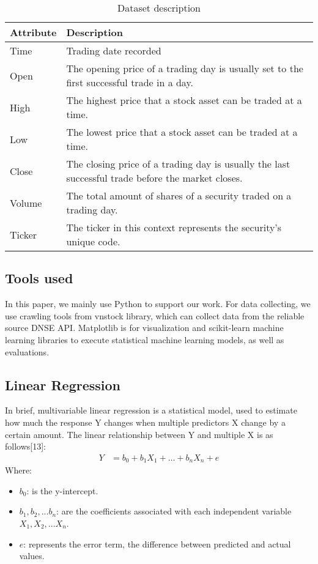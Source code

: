 \documentclass{ieeeojies}
\begin{document}
\begin{table}[h]
\caption{Dataset description}
\label{table}
\setlength{\tabcolsep}{3pt}
\begin{tabular}{|p{50pt}|p{155pt}|}
\hline
\textbf{Attribute}& 
\textbf{Description} \\
\hline
Time& 
Trading date recorded\\
\hline
Open& 
The opening price of a trading day is usually set to the first successful trade in a day.\\
\hline
High& 
The highest price that a stock asset can be traded at a time.\\
\hline
Low& 
The lowest price that a stock asset can be traded at a time.\\
\hline
Close&
The closing price of a trading day is usually the last successful trade before the market closes.\\
\hline
Volume&
The total amount of shares of a security traded on a trading day.\\
\hline
Ticker&
The ticker in this context represents the security’s unique code.\\
\hline
\end{tabular}
\label{tab1}
\end{table}
\subsection{Tools used}
In this paper, we mainly use Python to support our work. For data collecting, we use crawling tools from vnstock library, which can collect data from the reliable source DNSE API. Matplotlib is for visualization and scikit-learn machine learning libraries to execute statistical machine learning models, as well as evaluations.
\subsection{Linear Regression}
In brief, multivariable linear regression is a statistical model, used to estimate how much the response Y changes when multiple predictors X change by a certain amount. The linear relationship between Y and multiple X is as follows[13]:
\begin{align*}
  Y &= b_0 + b_1X_1 + \ldots + b_nX_n + e 
\end{align*}
Where:

\begin{itemize}
 \item \( b_0 \): is the y-intercept.
 \item \( b_1, b_2,...b_n \):  are the coefficients associated with each independent variable \( X_1, X_2,...X_n \).
 \item \(e\): represents the error term, the difference between predicted and actual values.
\end{itemize}
\end{document}
